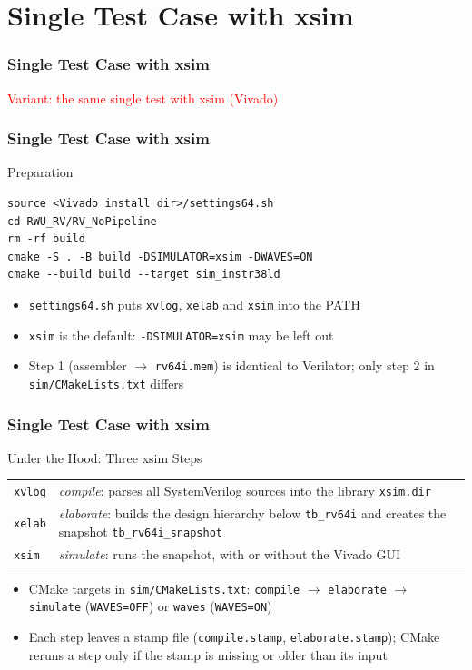 \documentclass{beamer}
\newcommand{\astitle}{nix}
\newcommand{\assubtitle}{nix}
\newcommand{\cmd}[1]{\texttt{#1}}
\begin{document}
\section{Single Test Case with xsim}
\renewcommand{\astitle}{Single Test Case with xsim}
\begin{frame}
\frametitle{\astitle}
\textcolor{red}{Variant: the same single test with xsim (Vivado)}
\end{frame}

\renewcommand{\assubtitle}{Preparation}
\begin{frame}[fragile]
\frametitle{\astitle}
\begin{block}{\assubtitle}
\begin{lstlisting}[style=sh,basicstyle=\ttfamily\small]
source <Vivado install dir>/settings64.sh
cd RWU_RV/RV_NoPipeline
rm -rf build
cmake -S . -B build -DSIMULATOR=xsim -DWAVES=ON
cmake --build build --target sim_instr38ld
\end{lstlisting}
  \begin{itemize}
    \item \cmd{settings64.sh} puts \cmd{xvlog}, \cmd{xelab} and \cmd{xsim} into the PATH
    \item \cmd{xsim} is the default: \cmd{-DSIMULATOR=xsim} may be left out
    \item Step 1 (assembler $\rightarrow$ \cmd{rv64i.mem}) is identical to Verilator;
      only step 2 in \cmd{sim/CMakeLists.txt} differs
  \end{itemize}
\end{block}
\end{frame}

\renewcommand{\assubtitle}{Under the Hood: Three xsim Steps}
\begin{frame}
\frametitle{\astitle}
\begin{block}{\assubtitle}
  \footnotesize
  \begin{tabularx}{\linewidth}{@{}lY@{}}
    \cmd{xvlog} & \emph{compile}: parses all SystemVerilog sources into the library \cmd{xsim.dir}\\[2pt]
    \cmd{xelab} & \emph{elaborate}: builds the design hierarchy below \cmd{tb\_rv64i}
                  and creates the snapshot \cmd{tb\_rv64i\_snapshot}\\[2pt]
    \cmd{xsim}  & \emph{simulate}: runs the snapshot, with or without the Vivado GUI\\
  \end{tabularx}
  \vspace{4pt}
  \begin{itemize}
    \item CMake targets in \cmd{sim/CMakeLists.txt}:
      \cmd{compile} $\rightarrow$ \cmd{elaborate} $\rightarrow$
      \cmd{simulate} (\cmd{WAVES=OFF}) or \cmd{waves} (\cmd{WAVES=ON})
    \item Each step leaves a stamp file (\cmd{compile.stamp}, \cmd{elaborate.stamp});
      CMake reruns a step only if the stamp is missing or older than its input
  \end{itemize}
\end{block}
\end{frame}
\end{document}
